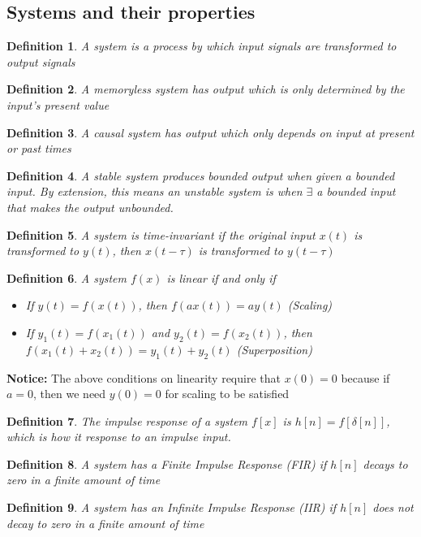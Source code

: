 \documentclass{article}
\newtheorem{definition}{Definition}
\begin{document}
\subsection{Systems and their properties}
\begin{definition}
    A system is a process by which input signals are transformed to output signals
\end{definition}
\begin{definition}
    A memoryless system has output which is only determined by the input's present value
\end{definition}
\begin{definition}
    A causal system has output which only depends on input at present or past times
\end{definition}
\begin{definition}
    A stable system produces bounded output when given a bounded input. By extension,
    this means an unstable system is when $\exists$ a bounded input that makes the output unbounded.
\end{definition}
\begin{definition}
    A system is time-invariant if the original input $x(t)$ is transformed to $y(t)$, then
    $x(t-\tau)$ is transformed to $y(t-\tau)$
\end{definition}
\begin{definition}
    A system $f(x)$ is linear if and only if
    \begin{itemize}
        \item If $y(t) = f(x(t))$, then $f(a x(t)) = a y(t)$ (Scaling)
        \item If $y_1(t) = f(x_1(t))$ and $y_2(t) = f(x_2(t))$, then $f(x_1(t) + x_2(t)) = y_1(t) + y_2(t)$ (Superposition)
    \end{itemize}
\end{definition}
\textbf{Notice: } The above conditions on linearity require that $x(0) = 0$ because if $a = 0$, then we need $y(0) = 0$ for scaling to be satisfied
\begin{definition}
    The impulse response of a system $f[x]$ is $h[n] = f[\delta[n]]$, which is how it response to an impulse input. 
\end{definition}
\begin{definition}
    A system has a Finite Impulse Response (FIR) if $h[n]$ decays to zero in a finite
    amount of time
\end{definition}
\begin{definition}
    A system has an Infinite Impulse Response (IIR) if $h[n]$ does not decay to zero in a finite
    amount of time
\end{definition}
\end{document}
